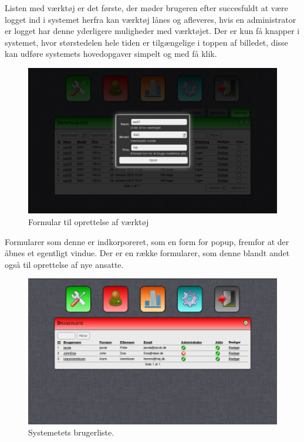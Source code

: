 \documentclass{article}
\begin{document}
Listen med værktøj er det første, der møder brugeren efter succesfuldt at være logget ind i systemet herfra kan værktøj lånes og afleveres, hvis en administrator er logget har denne yderligere muligheder med værktøjet. Der er kun få knapper i systemet, hvor størstedelen hele tiden er tilgængelige i toppen af billedet, disse kan udføre systemets hovedopgaver simpelt og med få klik. 

\begin{figure}[H]
\includegraphics[scale=0.40]{./figures/createtool.png}
\caption{Formular til oprettelse af værktøj}
\end{figure}

Formularer som denne er indkorporeret, som en form for popup, fremfor at der åbnes et egentligt vindue. Der er en række formularer, som denne blandt andet også til oprettelse af nye ansatte. 

\begin{figure}[H]
\includegraphics[scale=0.40]{./figures/Users.png}
\caption{Systemetets brugerliste. }
\end{figure}
\end{document}
